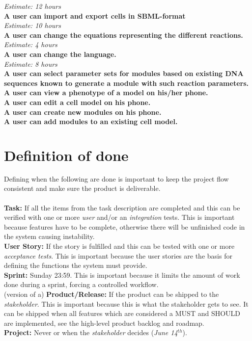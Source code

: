 \documentclass[10pt,a4paper]{report}
\begin{document}
		\indent
			\emph{Estimate: 12 hours} \\
		\textbf{A user can import and export cells in SBML-format}\\
		\indent
			\emph{Estimate: 10 hours}\\
		\textbf{A user can change the equations representing the different reactions.} \\
		\indent
			\emph{Estimate: 4 hours} \\
		\textbf{A user can change the language.} \\
		\indent
			\emph{Estimate: 8 hours} \\
		\textbf{A user can select parameter sets for modules based on existing DNA sequences known to generate a module with such reaction parameters.} \\
		\textbf{A user can view a phenotype of a model on his/her phone.} \\
		\textbf{A user can edit a cell model on his phone.} \\
		\textbf{A user can create new modules on his phone.} \\
		\textbf{A user can add modules to an existing cell model.} \\

	\clearpage
	\section{Definition of done}
		Defining when the following are done is important to keep the project flow consistent and make sure the product is deliverable. \\
		\\
		\textbf{Task:} If all the items from the task description are completed and this can be verified with one or more \emph{user} and/or an \emph{integration} tests. This is important because features have to be complete, otherwise there will be unfinished code in the system causing instability.\\
		\newline
		\textbf{User Story:} If the story is fulfilled and this can be tested with one or more \emph{acceptance tests}. This is important because the user stories are the basis for defining the functions the system must provide.\\
		\newline
		\textbf{Sprint:} Sunday 23:59. This is important because it limits the amount of work done during a sprint, forcing a controlled workflow.\\
		\newline
		(version of a) \textbf{Product/Release:} If the product can be shipped to the \emph{stakeholder}. This is important because this is what the stakeholder gets to see. It can be shipped when all features which are considered a MUST and SHOULD are implemented, see the high-level product backlog and roadmap. \\
		\newline
		\textbf{Project:} Never or when the \emph{stakeholder} decides (\emph{June 14$^{th}$}).
\end{document}
